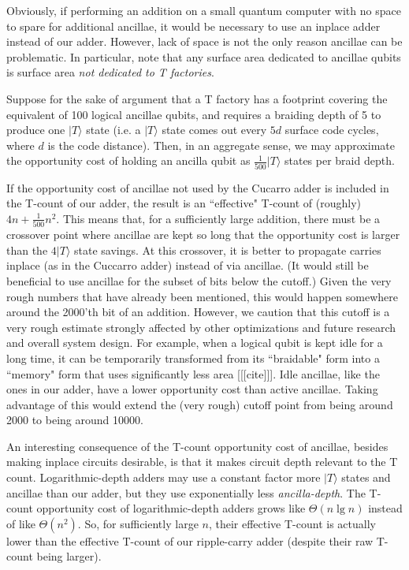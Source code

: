 \documentclass[twocolumn]{quantumarticle-customized}
\begin{document}
Obviously, if performing an addition on a small quantum computer with no space to spare for additional ancillae, it would be necessary to use an inplace adder instead of our adder.
However, lack of space is not the only reason ancillae can be problematic.
In particular, note that any surface area dedicated to ancillae qubits is surface area {\em not dedicated to T factories}.

Suppose for the sake of argument that a T factory has a footprint covering the equivalent of 100 logical ancillae qubits, and requires a braiding depth of 5 to produce one $|T\rangle$ state (i.e. a $|T\rangle$ state comes out every $5d$ surface code cycles, where $d$ is the code distance).
Then, in an aggregate sense, we may approximate the opportunity cost of holding an ancilla qubit as $\frac{1}{500} |T\rangle$ states per braid depth.

If the opportunity cost of ancillae not used by the Cucarro adder is included in the T-count of our adder, the result is an ``effective" T-count of (roughly) $4n + \frac{1}{500} n^2$.
This means that, for a sufficiently large addition, there must be a crossover point where ancillae are kept so long that the opportunity cost is larger than the $4 |T\rangle$ state savings.
At this crossover, it is better to propagate carries inplace (as in the Cuccarro adder) instead of via ancillae.
(It would still be beneficial to use ancillae for the subset of bits below the cutoff.)
Given the very rough numbers that have already been mentioned, this would happen somewhere around the 2000'th bit of an addition.
However, we caution that this cutoff is a very rough estimate strongly affected by other optimizations and future research and overall system design.
For example, when a logical qubit is kept idle for a long time, it can be temporarily transformed from its ``braidable" form into a ``memory" form that uses significantly less area [[[cite]]].
Idle ancillae, like the ones in our adder, have a lower opportunity cost than active ancillae.
Taking advantage of this would extend the (very rough) cutoff point from being around 2000 to being around 10000.

An interesting consequence of the T-count opportunity cost of ancillae, besides making inplace circuits desirable, is that it makes circuit depth relevant to the T count.
Logarithmic-depth adders may use a constant factor more $|T\rangle$ states and ancillae than our adder, but they use exponentially less {\em ancilla-depth}.
The T-count opportunity cost of logarithmic-depth adders grows like $\Theta(n \lg n)$ instead of like $\Theta(n^2)$.
So, for sufficiently large $n$, their effective T-count is actually lower than the effective T-count of our ripple-carry adder (despite their raw T-count being larger).
\end{document}

